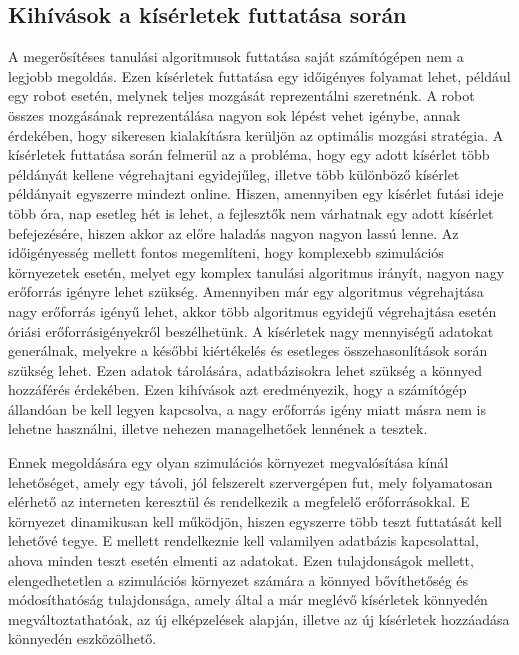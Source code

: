 \subsection{Kihívások a kísérletek futtatása során}
A megerősítéses tanulási algoritmusok futtatása saját számítógépen nem a legjobb megoldás. Ezen kísérletek futtatása egy időigényes folyamat lehet, például egy robot esetén, melynek teljes mozgását reprezentálni szeretnénk. A robot összes mozgásának reprezentálása nagyon sok lépést vehet igénybe, annak érdekében, hogy sikeresen kialakításra kerüljön az optimális mozgási stratégia. A kísérletek futtatása során felmerül az a probléma, hogy egy adott kísérlet több példányát  kellene végrehajtani egyidejűleg, illetve több különböző kísérlet példányait egyszerre mindezt online. Hiszen, amennyiben egy kísérlet futási ideje több óra, nap esetleg hét is lehet, a fejlesztők nem várhatnak egy adott kísérlet befejezésére, hiszen akkor az előre haladás nagyon nagyon lassú lenne. Az időigényesség mellett fontos megemlíteni, hogy komplexebb szimulációs környezetek esetén, melyet egy komplex tanulási algoritmus irányít, nagyon nagy erőforrás igényre lehet szükség. Amennyiben már egy algoritmus végrehajtása nagy erőforrás igényű lehet, akkor több algoritmus egyidejű végrehajtása esetén óriási erőforrásigényekről beszélhetünk. A kísérletek nagy mennyiségű adatokat generálnak, melyekre a későbbi kiértékelés és esetleges összehasonlítások során szükség lehet. Ezen adatok tárolására, adatbázisokra lehet szükség a könnyed hozzáférés érdekében. Ezen kihívások azt eredményezik, hogy a számítógép állandóan be kell legyen kapcsolva, a nagy erőforrás igény miatt másra nem is lehetne használni, illetve nehezen managelhetőek lennének a tesztek.  

Ennek megoldására egy olyan szimulációs környezet megvalósítása kínál lehetőséget, amely egy távoli, jól felszerelt szervergépen fut, mely folyamatosan elérhető az interneten keresztül és rendelkezik a megfelelő erőforrásokkal. E környezet dinamikusan kell működjön, hiszen egyszerre több teszt futtatását kell lehetővé tegye. E mellett rendelkeznie kell valamilyen adatbázis kapcsolattal, ahova minden teszt esetén elmenti az adatokat. Ezen tulajdonságok mellett, elengedhetetlen a szimulációs környezet számára a könnyed bővíthetőség és módosíthatóság tulajdonsága, amely által a már meglévő kísérletek könnyedén megváltoztathatóak, az új elképzelések alapján, illetve az új kísérletek hozzáadása könnyedén eszközölhető.

